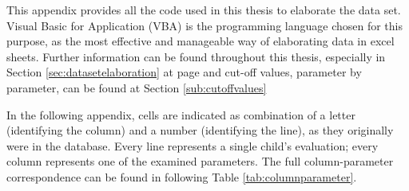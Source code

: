 \label{chap:appendixvbaexpressions}
This appendix provides all the code used in this thesis to elaborate the data set. Visual Basic for Application (VBA) is the programming language chosen for this purpose, as the most effective and manageable way of elaborating data in excel sheets. Further information can be found throughout this thesis, especially in Section \ref{sec:datasetelaboration} at page \pageref{sec:datasetelaboration} and cut-off values, parameter by parameter, can be found at Section \ref{sub:cutoffvalues}

In the following appendix, cells are indicated as combination of a letter (identifying the column) and a number (identifying the line), as they originally were in the database. Every line represents a single child's evaluation; every column represents one of the examined parameters. The full column-parameter correspondence can be found in following Table \ref{tab:columnparameter}.

\newlength\mylength
\setlength\mylength{\dimexpr\textwidth-5\arrayrulewidth-8\tabcolsep}


